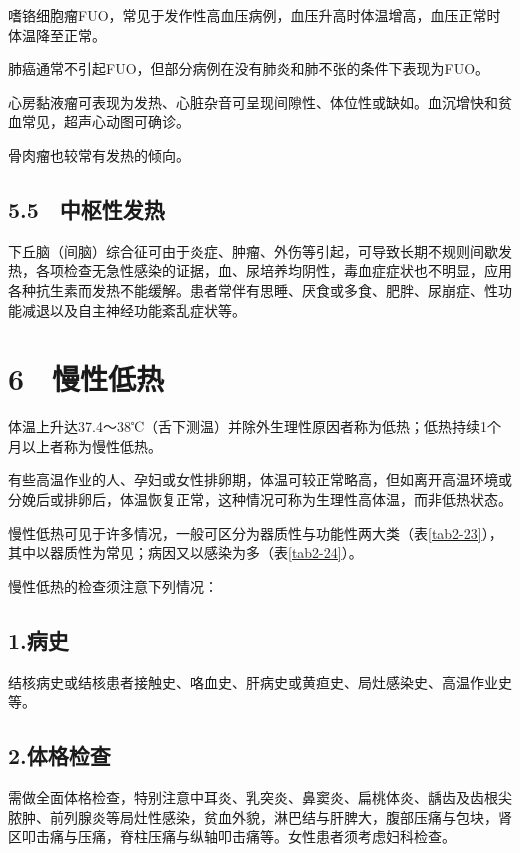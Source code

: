 嗜铬细胞瘤FUO，常见于发作性高血压病例，血压升高时体温增高，血压正常时体温降至正常。

肺癌通常不引起FUO，但部分病例在没有肺炎和肺不张的条件下表现为FUO。

心房黏液瘤可表现为发热、心脏杂音可呈现间隙性、体位性或缺如。血沉增快和贫血常见，超声心动图可确诊。

骨肉瘤也较常有发热的倾向。

\protect\hypertarget{text00037.html}{}{}

\subsection{5.5　中枢性发热}

下丘脑（间脑）综合征可由于炎症、肿瘤、外伤等引起，可导致长期不规则间歇发热，各项检查无急性感染的证据，血、尿培养均阴性，毒血症症状也不明显，应用各种抗生素而发热不能缓解。患者常伴有思睡、厌食或多食、肥胖、尿崩症、性功能减退以及自主神经功能紊乱症状等。

\protect\hypertarget{text00038.html}{}{}

\section{6　慢性低热}

体温上升达37.4～38℃（舌下测温）并除外生理性原因者称为低热；低热持续1个月以上者称为慢性低热。

有些高温作业的人、孕妇或女性排卵期，体温可较正常略高，但如离开高温环境或分娩后或排卵后，体温恢复正常，这种情况可称为生理性高体温，而非低热状态。

慢性低热可见于许多情况，一般可区分为器质性与功能性两大类（表\ref{tab2-23}），其中以器质性为常见；病因又以感染为多（表\ref{tab2-24}）。

慢性低热的检查须注意下列情况：

\subsection{1.病史}

结核病史或结核患者接触史、咯血史、肝病史或黄疸史、局灶感染史、高温作业史等。

\subsection{2.体格检查}

需做全面体格检查，特别注意中耳炎、乳突炎、鼻窦炎、扁桃体炎、龋齿及齿根尖脓肿、前列腺炎等局灶性感染，贫血外貌，淋巴结与肝脾大，腹部压痛与包块，肾区叩击痛与压痛，脊柱压痛与纵轴叩击痛等。女性患者须考虑妇科检查。


